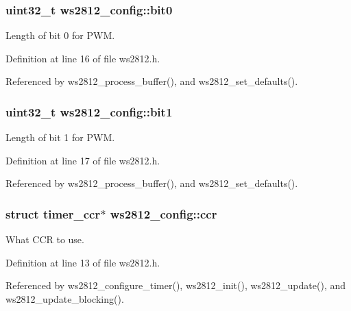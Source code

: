 \subsubsection[{bit0}]{\setlength{\rightskip}{0pt plus 5cm}uint32\+\_\+t ws2812\+\_\+config\+::bit0}\label{structws2812__config_a22370b6dc4cdf5c6e25c4c155a275046}


Length of bit 0 for P\+W\+M. 



Definition at line 16 of file ws2812.\+h.



Referenced by ws2812\+\_\+process\+\_\+buffer(), and ws2812\+\_\+set\+\_\+defaults().

\hypertarget{structws2812__config_a410b277b06bbb4ff2f8fd8c6fb5bc994}{}
\subsubsection[{bit1}]{\setlength{\rightskip}{0pt plus 5cm}uint32\+\_\+t ws2812\+\_\+config\+::bit1}\label{structws2812__config_a410b277b06bbb4ff2f8fd8c6fb5bc994}


Length of bit 1 for P\+W\+M. 



Definition at line 17 of file ws2812.\+h.



Referenced by ws2812\+\_\+process\+\_\+buffer(), and ws2812\+\_\+set\+\_\+defaults().

\hypertarget{structws2812__config_a0c4b50ce11c055c0457af653c4951ee9}{}
\subsubsection[{ccr}]{\setlength{\rightskip}{0pt plus 5cm}struct {\bf timer\+\_\+ccr}$\ast$ ws2812\+\_\+config\+::ccr}\label{structws2812__config_a0c4b50ce11c055c0457af653c4951ee9}


What C\+C\+R to use. 



Definition at line 13 of file ws2812.\+h.



Referenced by ws2812\+\_\+configure\+\_\+timer(), ws2812\+\_\+init(), ws2812\+\_\+update(), and ws2812\+\_\+update\+\_\+blocking().

